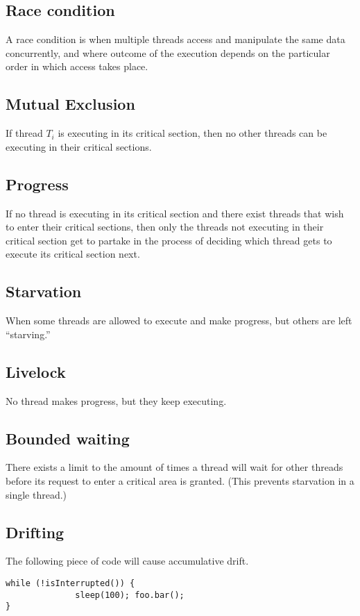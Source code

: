 \documentclass[a4paper]{article}
\begin{document}
\subsection{Race condition}
A race condition is when multiple threads access and manipulate the same
data concurrently, and where outcome of the execution depends on the
particular order in which access takes place.

\subsection{Mutual Exclusion}
If thread $T_i$ is executing in its critical section, then no other threads
can be executing in their critical sections.

\subsection{Progress}
If no thread is executing in its critical section and there exist threads
that wish to enter their critical sections, then only the threads not executing
in their critical section get to partake in the process of deciding which
thread gets to execute its critical section next.

\subsection{Starvation}
When some threads are allowed to execute and make progress, but others are
left ``starving.''

\subsection{Livelock}
No thread makes progress, but they keep executing.

\subsection{Bounded waiting}
There exists a limit to the amount of times a thread will wait for other
threads before its request to enter a critical area is granted. (This
prevents starvation in a single thread.)

\subsection{Drifting}
The following piece of code will cause accumulative drift.
\begin{lstlisting}[label=drift,caption=Drift example]
while (!isInterrupted()) {
              sleep(100); foo.bar();
}
\end{lstlisting}
\end{document}
